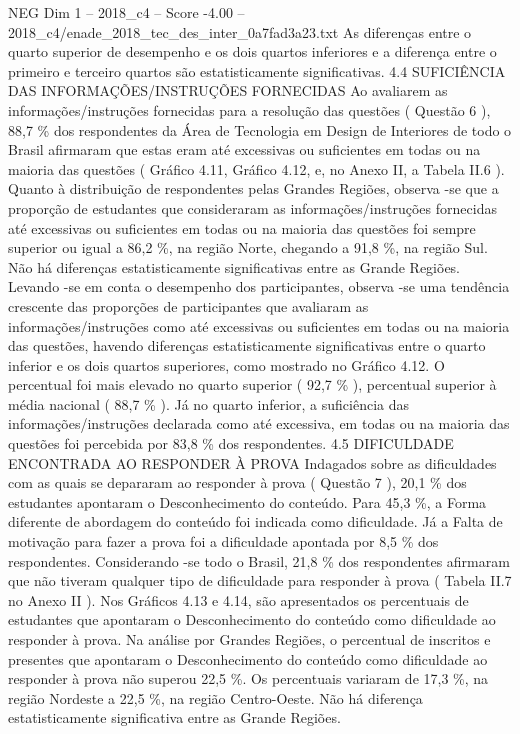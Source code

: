 \begin{textsample}{NEG Dim 1 – 2018\_c4 – Score -4.00 – 2018\_c4/enade\_2018\_tec\_des\_inter\_0a7fad3a23.txt}
As diferenças entre o quarto superior de desempenho e os dois quartos inferiores e a diferença entre o primeiro e terceiro quartos são estatisticamente significativas. 4.4 SUFICIÊNCIA DAS INFORMAÇÕES/INSTRUÇÕES FORNECIDAS Ao avaliarem as informações/instruções fornecidas para a resolução das questões ( Questão 6 ), 88,7 \% dos respondentes da Área de Tecnologia em Design de Interiores de todo o Brasil afirmaram que estas eram até excessivas ou suficientes em todas ou na maioria das questões ( Gráfico 4.11, Gráfico 4.12, e, no Anexo II, a Tabela II.6 ).
Quanto à distribuição de respondentes pelas Grandes Regiões, observa -se que a proporção de estudantes que consideraram as informações/instruções fornecidas até excessivas ou suficientes em todas ou na maioria das questões foi sempre superior ou igual a 86,2 \%, na região Norte, chegando a 91,8 \%, na região Sul.
Não há diferenças estatisticamente significativas entre as Grande Regiões.
Levando -se em conta o desempenho dos participantes, observa -se uma tendência crescente das proporções de participantes que avaliaram as informações/instruções como até excessivas ou suficientes em todas ou na maioria das questões, havendo diferenças estatisticamente significativas entre o quarto inferior e os dois quartos superiores, como mostrado no Gráfico 4.12.
O percentual foi mais elevado no quarto superior ( 92,7 \% ), percentual superior à média nacional ( 88,7 \% ).
Já no quarto inferior, a suficiência das informações/instruções declarada como até excessiva, em todas ou na maioria das questões foi percebida por 83,8 \% dos respondentes. 4.5 DIFICULDADE ENCONTRADA AO RESPONDER À PROVA Indagados sobre as dificuldades com as quais se depararam ao responder à prova ( Questão 7 ), 20,1 \% dos estudantes apontaram o Desconhecimento do conteúdo.
Para 45,3 \%, a Forma diferente de abordagem do conteúdo foi indicada como dificuldade.
Já a Falta de motivação para fazer a prova foi a dificuldade apontada por 8,5 \% dos respondentes.
Considerando -se todo o Brasil, 21,8 \% dos respondentes afirmaram que não tiveram qualquer tipo de dificuldade para responder à prova ( Tabela II.7 no Anexo II ).
Nos Gráficos 4.13 e 4.14, são apresentados os percentuais de estudantes que apontaram o Desconhecimento do conteúdo como dificuldade ao responder à prova.
Na análise por Grandes Regiões, o percentual de inscritos e presentes que apontaram o Desconhecimento do conteúdo como dificuldade ao responder à prova não superou 22,5 \%.
Os percentuais variaram de 17,3 \%, na região Nordeste a 22,5 \%, na região Centro-Oeste.
Não há diferença estatisticamente significativa entre as Grande Regiões.

\end{textsample}
